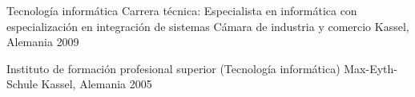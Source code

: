 

\begin{cventries}

Tecnología informática
  \cventry
    {Carrera técnica: Especialista en informática con especialización en integración de sistemas} %
    {Cámara de industria y comercio} %
    {Kassel, Alemania} %
    {2009} %
    {}

  \cventry
    {Instituto de formación profesional superior (Tecnología informática)} %
    {Max-Eyth-Schule} %
    {Kassel, Alemania} %
    {2005} %
    {}

\end{cventries}
